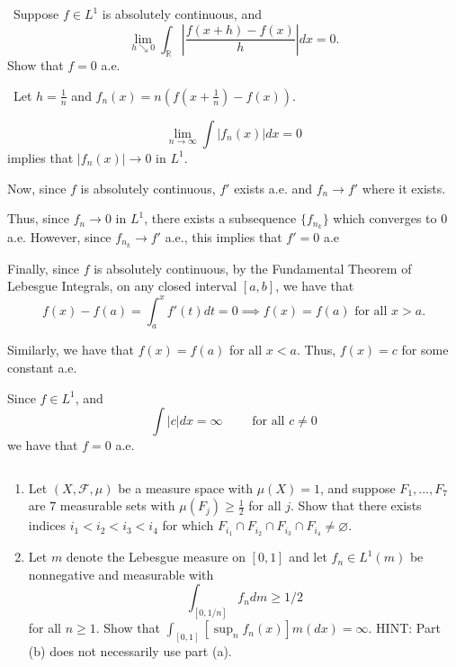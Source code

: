 \documentclass[12pt]{Homework}
\begin{document}
\newpage

\begin{problem} $\,$
Suppose $f\in L^1$ is absolutely continuous, and $$\lim_{h\searrow0}\int_\mathbb{R}\left|\frac{f(x+h)-f(x)}{h}\right|dx=0.$$ Show that $f=0$ a.e.
\end{problem}


\begin{solution}$\,$
Let $h=\frac{1}{n}$ and $f_n(x)=n(f(x+\frac{1}{n})-f(x))$.

$$\lim_{n\to\infty}\int|f_n(x)|dx=0$$ implies that $|f_n(x)|\to0$ in $L^1$.

Now, since $f$ is absolutely continuous, $f'$ exists a.e. and $f_n\to f'$ where it exists. 

Thus, since $f_n\to0$ in $L^1$, there exists a subsequence $\{f_{n_k}\}$ which converges to $0$ a.e. However, since $f_{n_k}\to f'$ a.e., this implies that $f'=0$ a.e 

Finally, since $f$ is absolutely continuous, by the Fundamental Theorem of Lebesgue Integrals, on any closed interval $[a,b]$, we have that $$f(x)-f(a)=\int_a^xf'(t)dt=0\implies f(x)=f(a)\text{ for all } x>a.$$

Similarly, we have that $f(x)=f(a)$ for all $x<a$. Thus, $f(x)=c$ for some constant a.e.

Since $f\in L^1$, and $$\int|c|dx=\infty\qquad\text{ for all }c\not=0$$ we have that $f=0$ a.e.
\end{solution}
\newpage

\begin{problem} $\,$
\begin{enumerate}[label=(\alph*)]
    \item Let $(X,\mathscr{F},\mu)$ be a measure space with $\mu(X)=1$, and suppose $F_1,...,F_7$ are $7$ measurable sets with $\mu(F_j)\ge\frac{1}{2}$ for all $j$. Show that there exists indices $i_1<i_2<i_3<i_4$ for which $F_{i_1}\cap F_{i_2}\cap F_{i_3}\cap F_{i_4}\not=\varnothing.$
    \item Let $m$ denote the Lebesgue measure on $[0,1]$ and let $f_n\in L^1(m)$ be nonnegative and measurable with $$\int_{[0,1/n]}f_ndm\ge1/2$$ for all $n\ge1.$ Show that $\int_{[0,1]}[\sup_nf_n(x)]m(dx)=\infty.$ HINT: Part (b) does not necessarily use part (a).
\end{enumerate}
\end{problem}
\end{document}
